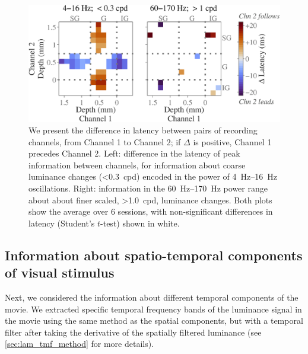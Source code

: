 \begin{figure}[htbp]
\centering
\includegraphics[scale=.5]{figs/lag/latencydifference-avg_nonsig1.eps}
%
\caption{
We present the difference in latency between pairs of recording channels, from Channel 1 to Channel 2; if $\Delta$ is positive, Channel 1 precedes Channel 2.
Left: difference in the latency of peak information between channels, for information about coarse luminance changes (\SI{<0.3}{cpd}) encoded in the power of \SIrange{4}{16}{Hz} oscillations.
Right: information in the \SIrange{60}{170}{Hz} power range about about finer scaled, \SI{>1.0}{cpd}, luminance changes.
Both plots show the average over \num{6} sessions, with non-significant differences in latency (Student's $t$-test) shown in white.
}
\label{fig:lam_latencydiff}
\end{figure}


\subsection{Information about spatio-temporal components of visual stimulus}
\label{sec:lam_spatmf}

Next, we considered the information about different temporal components of the movie.
We extracted specific temporal frequency bands of the luminance signal in the movie using the same method as the spatial components, but with a temporal filter after taking the derivative of the spatially filtered luminance (see \autoref{sec:lam_tmf_method} for more details).

